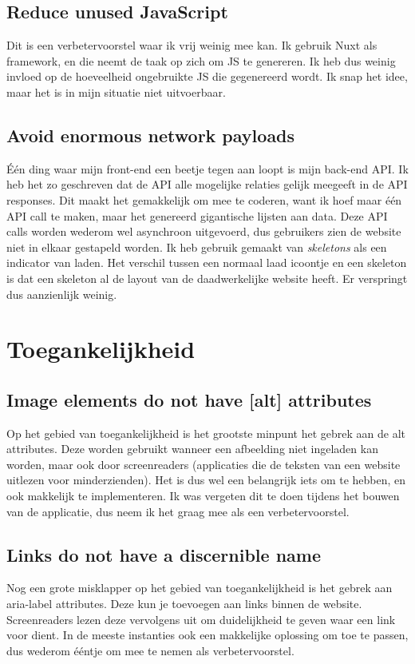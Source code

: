 \documentclass[a4paper]{report}
\begin{document}
    \subsection{Reduce unused JavaScript}
    Dit is een verbetervoorstel waar ik vrij weinig mee kan. Ik gebruik Nuxt als framework, en die neemt de taak op zich om JS te genereren.
    Ik heb dus weinig invloed op de hoeveelheid ongebruikte JS die gegenereerd wordt. Ik snap het idee, maar het is in mijn situatie niet uitvoerbaar.

    \subsection{Avoid enormous network payloads}
    Één ding waar mijn front-end een beetje tegen aan loopt is mijn back-end API. Ik heb het zo geschreven dat de API alle mogelijke relaties gelijk
    meegeeft in de API responses. Dit maakt het gemakkelijk om mee te coderen, want ik hoef maar één API call te maken, maar het genereerd gigantische
    lijsten aan data. Deze API calls worden wederom wel asynchroon uitgevoerd, dus gebruikers zien de website niet in elkaar gestapeld worden.
    Ik heb gebruik gemaakt van \textit{skeletons} als een indicator van laden. Het verschil tussen een normaal laad icoontje en een skeleton is dat een skeleton
    al de layout van de daadwerkelijke website heeft. Er verspringt dus aanzienlijk weinig.

    \section{Toegankelijkheid}
    \subsection{Image elements do not have [alt] attributes}
    Op het gebied van toegankelijkheid is het grootste minpunt het gebrek aan de {\selectfont alt} attributes.
    Deze worden gebruikt wanneer een afbeelding niet ingeladen kan worden, maar ook door screenreaders (applicaties die de teksten van een website uitlezen voor minderzienden).
    Het is dus wel een belangrijk iets om te hebben, en ook makkelijk te implementeren. Ik was vergeten dit te doen tijdens het bouwen van de applicatie, dus neem ik het graag mee
    als een verbetervoorstel.

    \subsection{Links do not have a discernible name}
    Nog een grote misklapper op het gebied van toegankelijkheid is het gebrek aan {\selectfont aria-label} attributes.
    Deze kun je toevoegen aan links binnen de website. Screenreaders lezen deze vervolgens uit om duidelijkheid te geven waar een link voor dient.
    In de meeste instanties ook een makkelijke oplossing om toe te passen, dus wederom ééntje om mee te nemen als verbetervoorstel.
\end{document}
